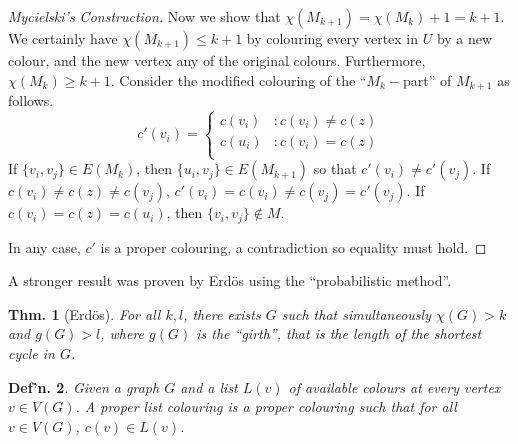 \documentclass[12pt, a4paper]{book}
\newtheorem{theorem}{Thm.}[section]
\newtheorem{definition}[theorem]{Def'n.}
\theoremstyle{nonumberplain}
\newtheorem{proof}{Proof}
\begin{document}
\begin{proof}[Mycielski's Construction]
    Now we show that $\chi(M_{k+1})=\chi(M_k)+1=k+1$.
    We certainly have $\chi(M_{k+1})\leq k+1$ by colouring every vertex in $U$ by a new colour, and the new vertex any of the original colours.
    Furthermore, $\chi(M_k)\geq k+1$.
    Consider the modified colouring of the ``$M_k-$part'' of $M_{k+1}$ as follows.
    \[c'(v_i) =
        \begin{cases}
            c(v_i)&:c(v_i)\neq c(z)\\
            c(u_i)&:c(v_i)= c(z)\\
        \end{cases}
    \]
    If $\{v_i,v_j\}\in E(M_k)$, then $\{u_i,v_j\}\in E(M_{k+1})$ so that $c'(v_i)\neq c'(v_j)$.
    If $c(v_i)\neq c(z)\neq c(v_j)$, $c'(v_i)=c(v_i)\neq c(v_j)=c'(v_j)$.
    If $c(v_i)=c(z)=c(u_i)$, then $\{v_i,v_j\}\notin M$.

    In any case, $c'$ is a proper colouring, a contradiction so equality must hold.
\end{proof}
A stronger result was proven by Erd\"os using the ``probabilistic method''.
\begin{theorem}[Erd\"os]
    For all $k,l$, there exists $G$ such that simultaneously $\chi(G)>k$ and $g(G)>l$, where $g(G)$ is the ``girth'', that is the length of the shortest cycle in $G$.
\end{theorem}
\begin{definition}
    Given a graph $G$ and a list $L(v)$ of available colours at every vertex $v\in V(G)$.
    A proper list colouring is a proper colouring such that for all $v\in V(G)$, $c(v)\in L(v)$.
\end{definition}
\end{document}
